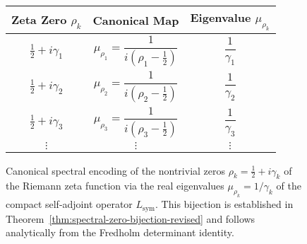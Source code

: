 \begin{figure}[ht]
\centering
\renewcommand{\arraystretch}{1.25}
\begin{tabular}{c|c|c}
\toprule
\textbf{Zeta Zero \( \rho_k \)} & \textbf{Canonical Map} & \textbf{Eigenvalue \( \mu_{\rho_k} \)} \\
\midrule
\( \tfrac{1}{2} + i\gamma_1 \) & \( \mu_{\rho_1} = \dfrac{1}{i(\rho_1 - \tfrac{1}{2})} \) & \( \dfrac{1}{\gamma_1} \) \\
\( \tfrac{1}{2} + i\gamma_2 \) & \( \mu_{\rho_2} = \dfrac{1}{i(\rho_2 - \tfrac{1}{2})} \) & \( \dfrac{1}{\gamma_2} \) \\
\( \tfrac{1}{2} + i\gamma_3 \) & \( \mu_{\rho_3} = \dfrac{1}{i(\rho_3 - \tfrac{1}{2})} \) & \( \dfrac{1}{\gamma_3} \) \\
\( \vdots \) & \( \vdots \) & \( \vdots \) \\
\bottomrule
\end{tabular}
\caption{
Canonical spectral encoding of the nontrivial zeros \( \rho_k = \tfrac{1}{2} + i\gamma_k \) of the Riemann zeta function via the real eigenvalues \( \mu_{\rho_k} = 1/\gamma_k \) of the compact self-adjoint operator \( L_{\mathrm{sym}} \). This bijection is established in Theorem~\ref{thm:spectral-zero-bijection-revised} and follows analytically from the Fredholm determinant identity.
}
\label{fig:spectral_bijection_table}
\end{figure}
%  
